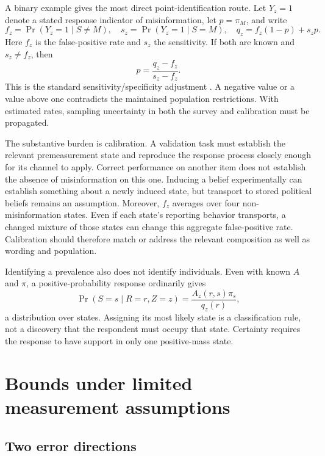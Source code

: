 \documentclass[11pt]{article}
\begin{document}
A binary example gives the most direct point-identification route. Let $Y_z=1$ denote a stated response indicator of misinformation, let $p=\pi_M$, and write
\begin{equation}
 f_z=\Pr(Y_z=1\mid S\ne M),\quad
 s_z=\Pr(Y_z=1\mid S=M),\quad
 q_z=f_z(1-p)+s_zp.
 \label{eq:binary}
\end{equation}
Here $f_z$ is the false-positive rate and $s_z$ the sensitivity. If both are known and $s_z\ne f_z$, then
\begin{equation}
 p=\frac{q_z-f_z}{s_z-f_z}.
 \label{eq:point}
\end{equation}
This is the standard sensitivity/specificity adjustment \citep{rogan1978}. A negative value or a value above one contradicts the maintained population restrictions. With estimated rates, sampling uncertainty in both the survey and calibration must be propagated.

The substantive burden is calibration. A validation task must establish the relevant premeasurement state and reproduce the response process closely enough for its channel to apply. Correct performance on another item does not establish the absence of misinformation on this one. Inducing a belief experimentally can establish something about a newly induced state, but transport to stored political beliefs remains an assumption. Moreover, $f_z$ averages over four non-misinformation states. Even if each state's reporting behavior transports, a changed mixture of those states can change this aggregate false-positive rate. Calibration should therefore match or address the relevant composition as well as wording and population.

Identifying a prevalence also does not identify individuals. Even with known $A$ and $\pi$, a positive-probability response ordinarily gives
\begin{equation}
 \Pr(S=s\mid R=r,Z=z)=\frac{A_z(r,s)\pi_s}{q_z(r)},
 \label{eq:posterior}
\end{equation}
a distribution over states. Assigning its most likely state is a classification rule, not a discovery that the respondent must occupy that state. Certainty requires the response to have support in only one positive-mass state.

\section{Bounds under limited measurement assumptions}

\subsection{Two error directions}
\end{document}
